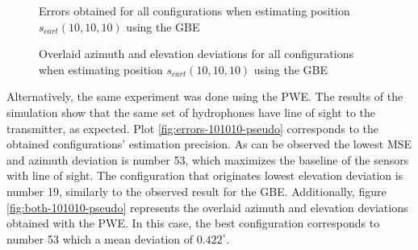 \begin{figure}[!htbp]
	\captionsetup{justification=centering,margin=2cm}
	\caption{Errors obtained for all configurations when estimating position $s_{cart}(10,10,10)$ using the GBE}
	\label{fig:errors-101010}
\end{figure}

\begin{figure}[!htbp]
	\captionsetup{justification=centering,margin=2cm}
	\caption{Overlaid azimuth and elevation deviations for all configurations when estimating position $s_{cart}(10,10,10)$ using the GBE}
	\label{fig:both-101010}
\end{figure}

Alternatively, the same experiment was done using the PWE. The results of the simulation show that the same set of hydrophones have line of sight to the transmitter, as expected. Plot \ref{fig:errors-101010-pseudo} corresponds to the obtained configurations' estimation precision. As can be observed the lowest MSE and azimuth deviation is number 53, which maximizes the baseline of the sensors with line of sight. The configuration that originates lowest elevation deviation is number 19, similarly to the observed result for the GBE. Additionally, figure \ref{fig:both-101010-pseudo} represents the overlaid azimuth and elevation deviations obtained with the PWE. In this case, the best configuration corresponds to number 53 which a mean deviation of $0.422^{\circ}$. 

